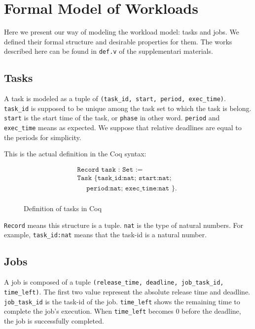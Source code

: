 \documentclass[nocopyrightspace]{sigplanconf}
\begin{document}
\section{Formal Model of Workloads}

Here we present our way of modeling the workload model: tasks and jobs. We defined their formal structure and desirable properties for them. The works described here can be found in \texttt{def.v} of the supplementari materials.

\subsection{Tasks}

A task is modeled as a tuple of \texttt{(task\_id, start, period, exec\_time)}. \texttt{task\_id} is supposed to be unique among the task set to which the task is belong. \texttt{start} is the start time of the task, or \texttt{phase} in other word. \texttt{period} and \texttt{exec\_time} means as expected. We suppose that relative deadlines are equal to the periods for simplicity.

This is the actual definition in the Coq syntax:

\begin{figure}[H]
  \[
  \begin{array}{l}
    \texttt{Record task : Set :=} \\
    \texttt{Task \{ task\_id:nat; start:nat; } \\
    \texttt{{~~~~}period:nat; exec\_time:nat \}. }\\
  \end{array}
  \]
  \caption{ Definition of tasks in Coq }\label{fig:task}

\end{figure}

\texttt{Record} means this structure is a tuple. \texttt{nat} is the type of natural numbers. For example, \texttt{task\_id:nat} means that the task-id is a natural number.

\subsection{Jobs}

A job is composed of a tuple \texttt{(release\_time, deadline, job\_task\_id, time\_left)}. The first two value represent the absolute release time and deadline. \texttt{job\_task\_id} is the task-id of the job. \texttt{time\_left} shows the remaining time to complete the job's execution. When \texttt{time\_left} becomes 0 before the deadline, the job is successfully completed.
\end{document}
